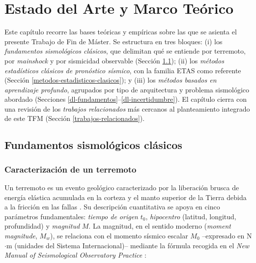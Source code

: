 
\cleardoublepage

\chapter{Estado del Arte y Marco Teórico}
\label{estado-del-arte-marco-teorico}

Este capítulo recorre las bases teóricas y empíricas sobre las que se asienta el presente Trabajo de Fin de Máster. Se estructura en tres bloques: (i) los \emph{fundamentos sismológicos clásicos}, que delimitan qué se entiende por terremoto, por \textit{mainshock} y por sismicidad observable (Sección \ref{fundamentos-sismologia}); (ii) los \emph{métodos estadísticos clásicos de pronóstico sísmico}, con la familia ETAS como referente (Sección \ref{metodos-estadisticos-clasicos}); y (iii) los \emph{métodos basados en aprendizaje profundo}, agrupados por tipo de arquitectura y problema sismológico abordado (Secciones \ref{dl-fundamentos}--\ref{dl-incertidumbre}). El capítulo cierra con una revisión de los \emph{trabajos relacionados} más cercanos al planteamiento integrado de este TFM (Sección \ref{trabajos-relacionados}).

\section{Fundamentos sismológicos clásicos}
\label{fundamentos-sismologia}

\subsection{Caracterización de un terremoto}
\label{caracterizacion-terremoto}

Un terremoto es un evento geológico caracterizado por la liberación brusca de energía elástica acumulada en la corteza y el manto superior de la Tierra debida a la fricción en las fallas \citep{stein2003introduction}. Su descripción cuantitativa se apoya en cinco parámetros fundamentales: \emph{tiempo de origen} $t_0$, \emph{hipocentro} (latitud, longitud, profundidad) y \emph{magnitud} $M$. La magnitud, en el sentido moderno (\textit{moment magnitude}, $M_w$), se relaciona con el momento sísmico escalar $M_0$ --expresado en N$\cdot$m (unidades del Sistema Internacional)-- mediante la fórmula recogida en el \emph{New Manual of Seismological Observatory Practice} \citep{bormann2012nmsop, bormann2011mw}:

